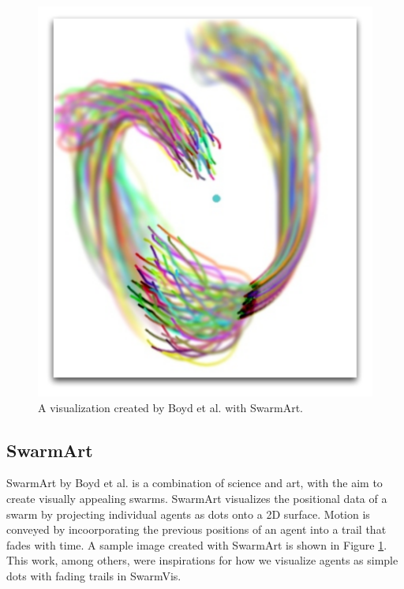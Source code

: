 \documentclass[conference]{IEEEtran}
\begin{document}
\begin{figure}
\centering
\includegraphics[scale=.333333]{images/SwarmArt.pdf}
\caption{A visualization created by Boyd et al. with SwarmArt\cite{Boyd}.}
\label{SwarmArt}
\end{figure}

\subsection{SwarmArt}
SwarmArt\cite{Boyd} by Boyd et al. is a combination of science and art, with the aim to create visually appealing swarms.
SwarmArt visualizes the positional data of a swarm by projecting individual agents as dots onto a 2D surface.
Motion is conveyed by incoorporating the previous positions of an agent into a trail that fades with time.
A sample image created with SwarmArt is shown in Figure \ref{SwarmArt}.
This work, among others\cite{codeswarm:website}, were inspirations for how we visualize agents as simple dots with fading trails
in SwarmVis.
\end{document}
